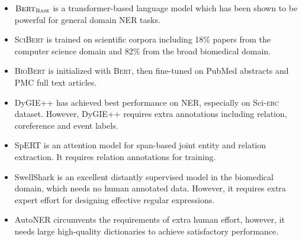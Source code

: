 \documentclass[10pt, conference, compsocconf]{IEEEtran}
\newcommand{\bert}{\textsc{Bert}\xspace}
\newcommand{\scivocab}{\textsc{SciVocab}\xspace}
\newcommand{\scibert}{\textsc{SciBert}\xspace}
\newcommand{\biobert}{\textsc{BioBert}\xspace}
\newcommand{\Scierc}{\textsc{S}ci-\textsc{erc}\xspace}
\newcommand{\bertbase}{$\bert_{\textsc{Base}}$\xspace}
\begin{document}
\begin{itemize}
    \item \bertbase\cite{devlin2018bert} is a transformer-based language model
        which has been shown to be powerful for general domain NER tasks.

    \item \scibert\cite{beltagy-etal-2019-scibert} is trained on 
        scientific corpora including 18\% papers from the computer science domain
        and 82\% from the broad biomedical domain. 
    \item \biobert\cite{lee2020biobert} is initialized with \bert, then fine-tuned on PubMed abstracts
        and PMC full text articles. 

        \item DyGIE++\cite{wadden-etal-2019-entity} has achieved 
        best performance on NER, especially on \Scierc dataset. However, DyGIE++ requires
        extra annotations including relation, coreference and event labels. 
        \item SpERT\cite{eberts2019span} is an attention model for span-based
        joint entity and relation extraction. It requires relation annotations for training.
    \item SwellShark\cite{fries2017swellshark} is an excellent 
        distantly supervised model in the biomedical domain, which needs no human annotated data.
        However, it requires extra expert effort for designing effective regular expressions.
    \item AutoNER\cite{shang-etal-2018-learning} circumvents the requirements
    of extra human effort, however, it needs large high-quality dictionaries
    to achieve satisfactory performance.

\end{itemize}
\end{document}
